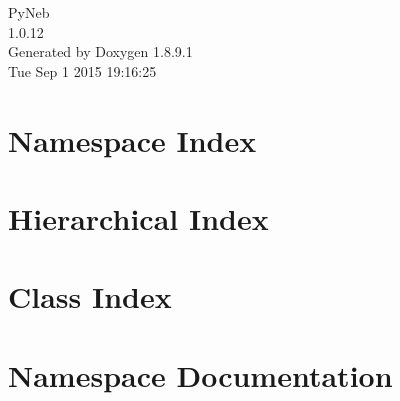 \documentclass[twoside]{book}
\newcommand{\+}{\discretionary{\mbox{\scriptsize$\hookleftarrow$}}{}{}}
\newcommand{\clearemptydoublepage}{%
  \newpage{\pagestyle{empty}\cleardoublepage}%
}
\begin{document}
\hypersetup{pageanchor=false,
             bookmarks=true,
             bookmarksnumbered=true,
             pdfencoding=unicode
            }
\begin{titlepage}
\vspace*{7cm}
\begin{center}%
{\Large Py\+Neb \\[1ex]\large 1.\+0.\+12 }\\
\vspace*{1cm}
{\large Generated by Doxygen 1.8.9.1}\\
\vspace*{0.5cm}
{\small Tue Sep 1 2015 19:16:25}\\
\end{center}
\end{titlepage}
\clearemptydoublepage
\tableofcontents
\clearemptydoublepage
{}
\hypersetup{pageanchor=true}

\chapter{Namespace Index}

\chapter{Hierarchical Index}

\chapter{Class Index}

\chapter{Namespace Documentation}































\end{document}
